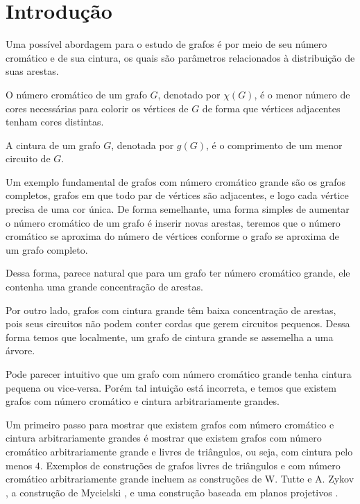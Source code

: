 \chapter{Introdução}
\label{cap:introducao}

Uma possível abordagem para o estudo de grafos é por meio de seu número cromático e de sua cintura, os quais são parâmetros relacionados à distribuição de suas arestas.

\begin{definicao}
O número cromático de um grafo $G$, denotado por $\chi(G)$, é o menor número de cores necessárias para colorir os vértices de $G$ de forma que vértices adjacentes tenham cores distintas.
\end{definicao}

\begin{definicao}
A cintura de um grafo $G$, denotada por $g(G)$, é o comprimento de um menor circuito de $G$.
\end{definicao}

Um exemplo fundamental de grafos com número cromático grande são os grafos completos, grafos em que todo par de vértices são adjacentes, e logo cada vértice precisa de uma cor única. De forma semelhante, uma forma simples de aumentar o número cromático de um grafo é inserir novas arestas, teremos que o número cromático se aproxima do número de vértices conforme o grafo se aproxima de um grafo completo.

Dessa forma, parece natural que para um grafo ter número cromático grande, ele contenha uma grande concentração de arestas.

Por outro lado, grafos com cintura grande têm baixa concentração de arestas, pois seus circuitos não podem conter cordas que gerem circuitos pequenos. Dessa forma temos que localmente, um grafo de cintura grande se assemelha a uma árvore.

Pode parecer intuitivo que um grafo com número cromático grande tenha cintura pequena ou vice-versa. Porém tal intuição está incorreta, e temos que existem grafos com número cromático e cintura arbitrariamente grandes.

Um primeiro passo para mostrar que existem grafos com número cromático e cintura arbitrariamente grandes é mostrar que existem grafos com número cromático arbitrariamente grande e livres de triângulos, ou seja, com cintura pelo menos $4$. Exemplos de construções de grafos livres de triângulos e com número cromático arbitrariamente grande incluem as construções de W. Tutte \cite{descartes1947three} e A. Zykov \cite{zykov1949some}, a construção de Mycielski \cite{mycielski1955coloriage}, e uma construção baseada em planos projetivos \cite{codenotti2000some}.

